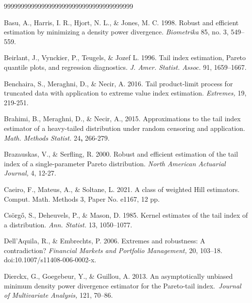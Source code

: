 \documentclass[12pt,reqno,openbib,runningheads,a4paper,portrait]{amsart}%
\begin{document}
\begin{thebibliography}{99999999999999999999999999999999999999}                                                           %


Basu, A., Harris, I. R., Hjort, N.
L., \& Jones, M. C. 1998. Robust and efficient estimation by minimizing a
density power divergence. \textit{Biometrika} 85, no. 3, 549--559.

Beirlant, J., Vynckier, P.,
Teugels, \& Jozef L. 1996. Tail index estimation, Pareto quantile plots, and
regression diagnostics. \textit{J. Amer. Statist. Assoc.} 91, 1659--1667.

Benchaira, S., Meraghni, D.,
\& Necir, A. 2016. Tail product-limit process for truncated data with
application to extreme value index estimation. \textit{Extremes, }19, 219-251.

Brahimi, B.,
Meraghni, D., \& Necir, A., 2015. Approximations to the tail index estimator
of a heavy-tailed distribution under random censoring and application.
\textit{Math. Methods Statist.} 24\textbf{,} 266-279.

Brazauskas, V., \& Serfling, R.
2000. Robust and efficient estimation of the tail index of a single-parameter
Pareto distribution. \textit{North American Actuarial Journal,} 4, 12-27.

Caeiro, F., Mateus, A., \&
Soltane, L. 2021. A class of weighted Hill estimators. Comput. Math. Methods
3, Paper No. e1167, 12 pp.

Cs\"{o}rg\H{o}, S.,
Deheuvels, P., \& Mason, D. 1985. Kernel estimates of the tail index of a
distribution. \textit{Ann. Statist.} 13, 1050--1077.

Dell'Aquila, R., \&
Embrechts, P. 2006. Extremes and robustness: A contradiction?
\textit{Financial Markets and Portfolio Management,} 20, 103--18. doi:10.1007/s11408-006-0002-x.

Dierckx, G., Goegebeur, Y., \&
Guillou, A. 2013. An asymptotically unbiased minimum density power divergence
estimator for the Pareto-tail index.\textit{\ Journal of Multivariate
Analysis,} 121, 70--86.


\end{thebibliography}
\end{document}

